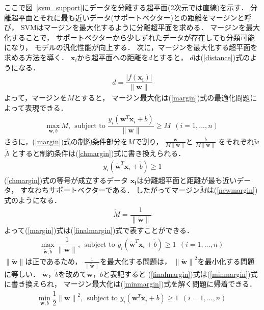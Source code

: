 ここで図~\ref{svm_support}にデータを分離する超平面(2次元では直線)を示す．
分離超平面とそれに最も近いデータ(サポートベクター)との距離をマージンと呼び，
SVMはマージンを最大化するように分離超平面を求める．
マージンを最大化することで，
サポートベクターから少しずれたデータが存在しても分類可能になり，
モデルの汎化性能が向上する．
次に，マージンを最大化する超平面を求める方法を導く．
$\boldsymbol{x}_i$から超平面への距離を$d$とすると，
$d$は(\ref{distance})式のようになる．
\begin{align}
    \label{distance}
d = \dfrac{|f(\boldsymbol{x_i})|}{\|\boldsymbol{w}\| }
\end{align}
よって，マージンを$M$とすると，
マージン最大化は(\ref{margin})式の最適化問題によって表現できる．
\begin{align}
    \label{margin}
    \underset{{\boldsymbol{w},b}}{\text{max}}~M,~~ \text{subject to } \dfrac{y_i(\boldsymbol{w}^T \boldsymbol{x}_i + b)}{\|\boldsymbol{w}\|}
    \geq M ~~  (i=1,...,n)
\end{align}
さらに，(\ref{margin})式の制約条件部分を$M$で割り，
$\frac{\boldsymbol{w}}{M\|\boldsymbol{w}\|}$と
$\frac{b}{M\|\boldsymbol{w}\|}$
をそれぞれ$\tilde{w}$,$\tilde{b}$
とすると制約条件は(\ref{chmargin})式に書き換えられる．
\begin{align}
    \label{chmargin}
    y_i(\boldsymbol{\tilde{w}}^T \boldsymbol{x}_i + \tilde{b}) \geq 1
\end{align}
(\ref{chmargin})式の等号が成立するデータ
$\boldsymbol{x_i}$は分離超平面と距離が最も近いデータ，
すなわちサポートベクターである．
したがってマージン$\tilde{M}$は(\ref{newmargin})式のようになる．
\begin{align}
    \label{newmargin}
   \tilde{M} = \dfrac{1}{\|\boldsymbol{\tilde{w}}\|}
\end{align}
よって(\ref{margin})式は(\ref{finalmargin})式で表すことができる．
\begin{align}
    \label{finalmargin}
    \underset{\boldsymbol{\tilde{w}},\tilde{b}}{\text{max}}~\dfrac{1}{\|\boldsymbol{\tilde{w}}\|},
  ~~ \text{subject to } y_i(\boldsymbol{\tilde{w}}^T \boldsymbol{x}_i + \tilde{b}) \geq 1~~  (i=1,...,n)
\end{align}
$\|\boldsymbol{\tilde{w}}\|$は正であるため，
$\frac{1}{\|\boldsymbol{\tilde{w}}\|}$を最大化する問題は，
${\|\boldsymbol{\tilde{w}}\|}^2$を最小化する問題に等しい．
$\boldsymbol{\tilde{w}}$，$\tilde{b}$を改めて$\boldsymbol{w}$，$b$と表記すると
(\ref{finalmargin})式は(\ref{minmargin})式に書き換えられ，
マージン最大化は(\ref{minmargin})式を解く問題に帰着できる．
\begin{align}
    \label{minmargin}
    \underset{\boldsymbol{w},b}{\text{min}}~\dfrac{1}{2}{\|\boldsymbol{{w}}\|}^2,
  ~~ \text{subject to } y_i(\boldsymbol{w}^T \boldsymbol{x}_i + b) \geq 1~~  (i=1,...,n)
\end{align}
